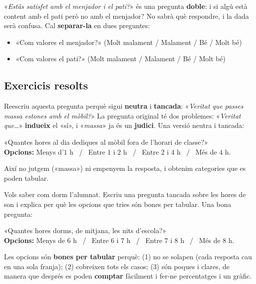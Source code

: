\begin{exemple}
«\emph{Estàs satisfet amb el menjador i el pati?}» és una pregunta \textbf{doble}: i
si algú està content amb el pati però no amb el menjador? No sabrà què respondre, i la
dada serà confusa. Cal \textbf{separar-la} en dues preguntes:
\begin{itemize}[leftmargin=1.4em, itemsep=1pt]
  \item «Com valores el menjador?» (Molt malament / Malament / Bé / Molt bé)
  \item «Com valores el pati?» (Molt malament / Malament / Bé / Molt bé)
\end{itemize}
\end{exemple}

\subsection{Exercicis resolts}

\begin{exresolt}
Reescriu aquesta pregunta perquè sigui \textbf{neutra} i \textbf{tancada}:
«\emph{Veritat que passes massa estones amb el mòbil?}»
\solucio
La pregunta original té dos problemes: «\emph{Veritat que\dots}» \textbf{indueix} el
«sí», i «\emph{massa}» ja és un \textbf{judici}. Una versió neutra i tancada:
\begin{center}
«Quantes hores al dia dediques al mòbil fora de l'horari de classe?»\\
\textbf{Opcions:} Menys d'$1$ h \ / \ Entre $1$ i $2$ h \ / \ Entre $2$ i $4$ h \ / \ Més de $4$ h.
\end{center}
Així no jutgem («massa») ni empenyem la resposta, i obtenim categories que es poden
tabular.
\end{exresolt}

\begin{exresolt}
Vols saber com dorm l'alumnat. Escriu una pregunta tancada sobre les hores de son i
explica per què les opcions que tries són bones per tabular.
\solucio
Una bona pregunta:
\begin{center}
«Quantes hores dorms, de mitjana, les nits d'escola?»\\
\textbf{Opcions:} Menys de $6$ h \ / \ Entre $6$ i $7$ h \ / \ Entre $7$ i $8$ h \ / \ Més de $8$ h.
\end{center}
Les opcions són \textbf{bones per tabular} perquè: (1) no se solapen (cada resposta cau
en una sola franja); (2) cobreixen tots els casos; (3) són poques i clares, de manera
que després es poden \textbf{comptar} fàcilment i fer-ne percentatges i un gràfic.
\end{exresolt}

